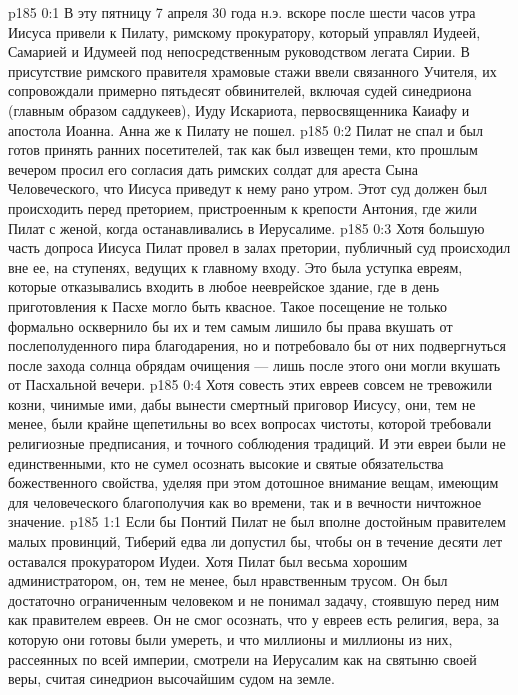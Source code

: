 \author{Комиссия срединников}
\vs p185 0:1 В эту пятницу 7 апреля 30 года н.э. вскоре после шести часов утра Иисуса привели к Пилату, римскому прокуратору, который управлял Иудеей, Самарией и Идумеей под непосредственным руководством легата Сирии. В присутствие римского правителя храмовые стажи ввели связанного Учителя, их сопровождали примерно пятьдесят обвинителей, включая судей синедриона (главным образом саддукеев), Иуду Искариота, первосвященника Каиафу и апостола Иоанна. Анна же к Пилату не пошел.
\vs p185 0:2 Пилат не спал и был готов принять ранних посетителей, так как был извещен теми, кто прошлым вечером просил его согласия дать римских солдат для ареста Сына Человеческого, что Иисуса приведут к нему рано утром. Этот суд должен был происходить перед преторием, пристроенным к крепости Антония, где жили Пилат с женой, когда останавливались в Иерусалиме.
\vs p185 0:3 Хотя большую часть допроса Иисуса Пилат провел в залах претории, публичный суд происходил вне ее, на ступенях, ведущих к главному входу. Это была уступка евреям, которые отказывались входить в любое нееврейское здание, где в день приготовления к Пасхе могло быть квасное. Такое посещение не только формально осквернило бы их и тем самым лишило бы права вкушать от послеполуденного пира благодарения, но и потребовало бы от них подвергнуться после захода солнца обрядам очищения --- лишь после этого они могли вкушать от Пасхальной вечери.
\vs p185 0:4 Хотя совесть этих евреев совсем не тревожили козни, чинимые ими, дабы вынести смертный приговор Иисусу, они, тем не менее, были крайне щепетильны во всех вопросах чистоты, которой требовали религиозные предписания, и точного соблюдения традиций. И эти евреи были не единственными, кто не сумел осознать высокие и святые обязательства божественного свойства, уделяя при этом дотошное внимание вещам, имеющим для человеческого благополучия как во времени, так и в вечности ничтожное значение.
\vs p185 1:1 Если бы Понтий Пилат не был вполне достойным правителем малых провинций, Тиберий едва ли допустил бы, чтобы он в течение десяти лет оставался прокуратором Иудеи. Хотя Пилат был весьма хорошим администратором, он, тем не менее, был нравственным трусом. Он был достаточно ограниченным человеком и не понимал задачу, стоявшую перед ним как правителем евреев. Он не смог осознать, что у евреев есть  религия, вера, за которую они готовы были умереть, и что миллионы и миллионы из них, рассеянных по всей империи, смотрели на Иерусалим как на святыню своей веры, считая синедрион высочайшим судом на земле.

